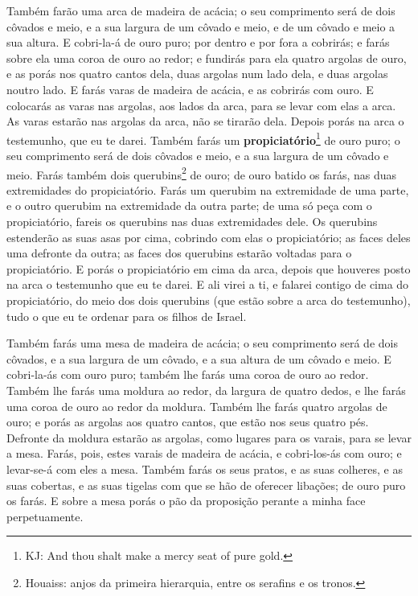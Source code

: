 Também farão uma arca de madeira de acácia; o seu comprimento
será de dois côvados e meio, e a sua largura de um côvado e meio, e
de um côvado e meio a sua altura. E cobri-la-á de ouro puro;
por dentro e por fora a cobrirás; e farás sobre ela uma coroa de
ouro ao redor; e fundirás para ela quatro argolas de ouro, e
as porás nos quatro cantos dela, duas argolas num lado dela, e duas
argolas noutro lado. E farás varas de madeira de acácia, e as
cobrirás com ouro. E colocarás as varas nas argolas, aos
lados da arca, para se levar com elas a arca. As varas
estarão nas argolas da arca, não se tirarão dela. Depois
porás na arca o testemunho, que eu te darei. Também farás um
\textbf{propiciatório}\footnote{KJ: And thou shalt make a mercy seat
of pure gold.} de ouro puro; o seu comprimento será de dois côvados
e meio, e a sua largura de um côvado e meio. Farás também
dois querubins\footnote{Houaiss: anjos da primeira hierarquia, entre
os serafins e os tronos.} de ouro; de ouro batido os farás, nas duas
extremidades do propiciatório. Farás um querubim na
extremidade de uma parte, e o outro querubim na extremidade da outra
parte; de uma só peça com o propiciatório, fareis os querubins nas
duas extremidades dele. Os querubins estenderão as suas asas
por cima, cobrindo com elas o propiciatório; as faces deles uma
defronte da outra; as faces dos querubins estarão voltadas para o
propiciatório. E porás o propiciatório em cima da arca,
depois que houveres posto na arca o testemunho que eu te darei.
E ali virei a ti, e falarei contigo de cima do propiciatório,
do meio dos dois querubins (que estão sobre a arca do testemunho),
tudo o que eu te ordenar para os filhos de Israel.

Também farás uma mesa de madeira de acácia; o seu comprimento
será de dois côvados, e a sua largura de um côvado, e a sua altura
de um côvado e meio. E cobri-la-ás com ouro puro; também lhe
farás uma coroa de ouro ao redor. Também lhe farás uma
moldura ao redor, da largura de quatro dedos, e lhe farás uma coroa
de ouro ao redor da moldura. Também lhe farás quatro argolas
de ouro; e porás as argolas aos quatro cantos, que estão nos seus
quatro pés. Defronte da moldura estarão as argolas, como
lugares para os varais, para se levar a mesa. Farás, pois,
estes varais de madeira de acácia, e cobri-los-ás com ouro; e
levar-se-á com eles a mesa. Também farás os seus pratos, e as
suas colheres, e as suas cobertas, e as suas tigelas com que se hão
de oferecer libações; de ouro puro os farás. E sobre a mesa
porás o pão da proposição perante a minha face perpetuamente.

